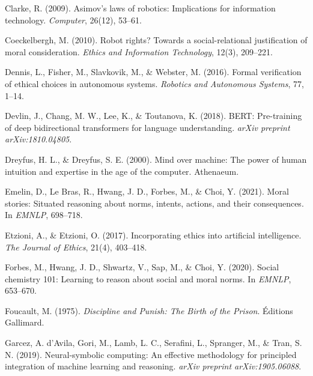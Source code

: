 \documentclass[12pt]{article}
\begin{document}
\begin{thebibliography}{99}
Clarke, R. (2009).
\newblock Asimov's laws of robotics: Implications for information technology.
\newblock \textit{Computer}, 26(12), 53--61.

Coeckelbergh, M. (2010).
\newblock Robot rights? Towards a social-relational justification of moral consideration.
\newblock \textit{Ethics and Information Technology}, 12(3), 209--221.

Dennis, L., Fisher, M., Slavkovik, M., \& Webster, M. (2016).
\newblock Formal verification of ethical choices in autonomous systems.
\newblock \textit{Robotics and Autonomous Systems}, 77, 1--14.

Devlin, J., Chang, M. W., Lee, K., \& Toutanova, K. (2018).
\newblock BERT: Pre-training of deep bidirectional transformers for language understanding.
\newblock \textit{arXiv preprint arXiv:1810.04805}.

Dreyfus, H. L., \& Dreyfus, S. E. (2000).
\newblock Mind over machine: The power of human intuition and expertise in the age of the computer.
\newblock Athenaeum.

Emelin, D., Le Bras, R., Hwang, J. D., Forbes, M., \& Choi, Y. (2021).
\newblock Moral stories: Situated reasoning about norms, intents, actions, and their consequences.
\newblock In \textit{EMNLP}, 698--718.

Etzioni, A., \& Etzioni, O. (2017).
\newblock Incorporating ethics into artificial intelligence.
\newblock \textit{The Journal of Ethics}, 21(4), 403--418.

Forbes, M., Hwang, J. D., Shwartz, V., Sap, M., \& Choi, Y. (2020).
\newblock Social chemistry 101: Learning to reason about social and moral norms.
\newblock In \textit{EMNLP}, 653--670.

Foucault, M. (1975).
\newblock \textit{Discipline and Punish: The Birth of the Prison}.
\newblock Éditions Gallimard.

Garcez, A. d'Avila, Gori, M., Lamb, L. C., Serafini, L., Spranger, M., \& Tran, S. N. (2019).
\newblock Neural-symbolic computing: An effective methodology for principled integration of machine learning and reasoning.
\newblock \textit{arXiv preprint arXiv:1905.06088}.


\end{thebibliography}
\end{document}
